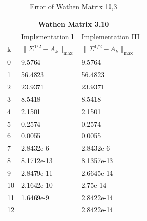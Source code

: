\begin{table}
\begin{center}
\label{Table: Wathen 10,3}
\begin{tabular}{| l | l | l | }

	\hline
	\multicolumn{3}{|c|}{Wathen Matrix 3,10}  \\
	\hline
	   & Implementation I & Implementation III \\
	k & $\parallel \Sigma^{1/2} - A_{k}\parallel_{\text{max}}$ & $\parallel \Sigma^{1/2} - A_{k}\parallel_{\text{max}}$  \\	
	\hline
	0 & 9.5764 & 9.5764 \\
	1 & 56.4823& 56.4823  \\
	2 & 23.9371& 23.9371   \\
	3 & 8.5418& 8.5418 \\
	4 & 2.1501& 2.1501  \\
	5 & 0.2574& 0.2574  \\
	6 & 0.0055& 0.0055  \\
	7 & 2.8432e-6& 2.8432e-6  \\
	8 & 8.1712e-13& 8.1357e-13  \\
	9 & 2.8479e-11& 2.6645e-14  \\
	10& 2.1642e-10 & 2.75e-14 \\ 
	11& 1.6469e-9 & 2.8422e-14\\
	12& & 2.8422e-14 \\
	\hline
	
\end{tabular}
\caption{Error of Wathen Matrix 10,3}
\end{center}
\end{table}


